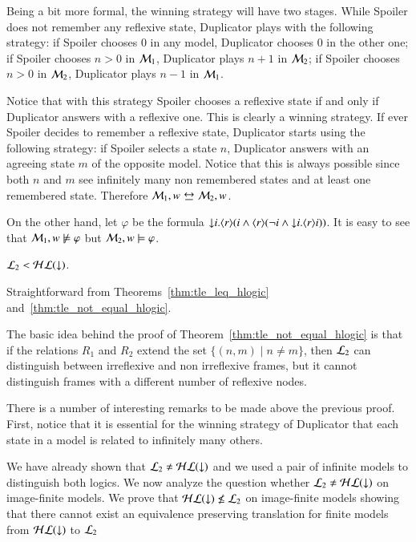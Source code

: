 \begin{pf}
Being a bit more formal, the winning strategy will have two stages. While Spoiler does not remember any reflexive
state, Duplicator plays with the following strategy: if Spoiler
chooses $0$ in any model, Duplicator chooses $0$ in the other one;
if Spoiler chooses $n>0$ in $\mathcal{M}_1$, Duplicator plays $n+1$ in
$\mathcal{M}_2$; if Spoiler chooses $n>0$ in $\mathcal{M}_2$, Duplicator plays
$n-1$ in $\mathcal{M}_1$.

Notice that with this strategy Spoiler chooses
a reflexive state if and only if Duplicator answers with a reflexive
one. This is clearly a winning strategy. If ever Spoiler decides to
remember a reflexive state, Duplicator starts using the following
strategy: if Spoiler selects a state $n$, Duplicator answers with an
agreeing state $m$ of the opposite model. Notice that this is always
possible since both $n$ and $m$ see infinitely many non remembered
states and at least one remembered state. Therefore $\model_1,w \bisim \model_2, w$.

On the other hand, let $\varphi$ be the formula ${\downarrow} i. \langle r \rangle(i
\land \langle r \rangle(\lnot i \land {\downarrow} i.\langle r \rangle i))$. It is easy to see
that $\mathcal{M}_1, w \not \models \varphi$ but $\mathcal{M}_2, w \models
\varphi$.
\end{pf}

\begin{cor}
$\mathcal{L}_2<\mathcal{HL}({\downarrow})$.
\end{cor}

\begin{pf}
Straightforward from Theorems~\ref{thm:tle_leq_hlogic}
and~\ref{thm:tle_not_equal_hlogic}.
\end{pf}

The basic idea behind the proof of
Theorem~\ref{thm:tle_not_equal_hlogic} is that if the relations
$R_1$ and $R_2$ extend the set $\{(n,m) \mid n\not= m\}$, then
$\mathcal{L}_2$ can distinguish between irreflexive and non irreflexive
frames, but it cannot distinguish frames with a different number of
reflexive nodes.

There is a number of interesting remarks to be made above the
previous proof. First, notice that it is essential for the winning
strategy of Duplicator that each state in a model is related to
infinitely many others.


We have already shown that $\mathcal{L}_2 \not= \mathcal{HL}({\downarrow})$ and we used a
pair of infinite models to distinguish both logics. We now analyze
the question whether $\mathcal{L}_2 \not= \mathcal{HL}({\downarrow})$ on image-finite models.
We prove that $\mathcal{HL}({\downarrow}) \not \leq \mathcal{L}_2$ on image-finite models
showing that there cannot exist an equivalence preserving
translation for finite models from $\mathcal{HL}({\downarrow})$ to $\mathcal{L}_2$


